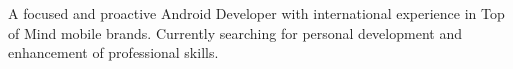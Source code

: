 \documentclass[9pt]{developercv} %
\begin{document}
\vspace{0.5cm}



\begin{minipage}[t]{0.5\textwidth} %
	\vspace{-\baselineskip} %
A focused and proactive Android Developer with \newline international experience in Top of Mind mobile brands. \newline Currently searching for personal development and \newline enhancement of professional skills.
\end{minipage}
\hfill %
\begin{minipage}[t]{0.45\textwidth} %
	\vspace{-\baselineskip} %
	\begin{barchart}{5.5}
	\end{barchart}
\end{minipage}

\end{document}
